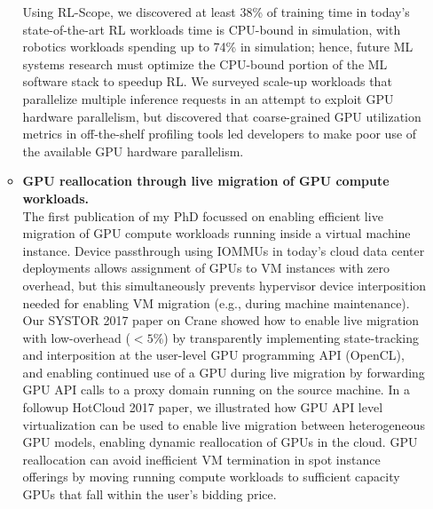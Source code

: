 \documentclass[letterpaper,11pt]{article}
\newcommand{\BulletZeroLeftMargin}{1.5em}
\newcommand{\resitem}[1]{\item #1 \vspace{-2pt}}
\begin{document}
\begin{itemize}[leftmargin=\BulletZeroLeftMargin]
\begin{itemize}[leftmargin=\BulletZeroLeftMargin]
{            Using RL-Scope, we discovered at least 38\% of training time in today's state-of-the-art RL workloads time is CPU-bound in simulation, with robotics workloads spending up to 74\% in simulation; hence, future ML systems research must optimize the CPU-bound portion of the ML software stack to speedup RL.  
            We surveyed scale-up workloads that parallelize multiple inference requests in an attempt to exploit GPU hardware parallelism, but discovered that coarse-grained GPU utilization metrics in off-the-shelf profiling tools led developers to make poor use of the available GPU hardware parallelism.
        }
        \resitem{
            \textbf{GPU reallocation through live migration of GPU compute workloads.} \\
            The first publication of my PhD focussed on enabling efficient live migration of GPU compute workloads running inside a virtual machine instance.
            Device passthrough using IOMMUs in today's cloud data center deployments allows assignment of GPUs to VM instances with zero overhead, but this simultaneously prevents hypervisor device interposition needed for enabling VM migration (e.g., during machine maintenance).
            Our SYSTOR 2017 paper on Crane showed how to enable live migration with low-overhead ($< 5\%$) by transparently implementing state-tracking and interposition at the user-level GPU programming API (OpenCL), and enabling continued use of a GPU during live migration by forwarding GPU API calls to a proxy domain running on the source machine.
            In a followup HotCloud 2017 paper, we illustrated how GPU API level virtualization can be used to enable live migration between heterogeneous GPU models, enabling dynamic reallocation of GPUs in the cloud.
            GPU reallocation can avoid inefficient VM termination in spot instance offerings by moving running compute workloads to sufficient capacity GPUs that fall within the user's bidding price.
        }
    \end{itemize}

\clearpage


\end{itemize}
\end{document}
